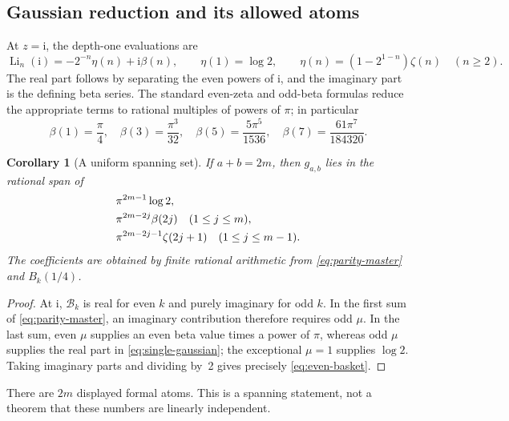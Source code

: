 \documentclass[11pt,a4paper]{article}
\numberwithin{equation}{section}
\newtheorem{corollary}[theorem]{Corollary}
\theoremstyle{definition}
\theoremstyle{remark}
\newcommand{\Li}{\operatorname{Li}}
\newcommand{\ii}{\mathrm{i}}
\newcommand{\BB}{\mathcal B}
\begin{document}
\subsection{Gaussian reduction and its allowed atoms}
At $z=\ii$, the depth-one evaluations are
\begin{equation}\label{eq:single-gaussian}
 \Li_n(\ii)=-2^{-n}\eta(n)+\ii\beta(n),\qquad
 \eta(1)=\log2,\qquad
 \eta(n)=(1-2^{1-n})\zeta(n)\quad(n\ge2).
\end{equation}
The real part follows by separating the even powers of $\ii$, and the imaginary part is the defining beta series. The standard even-zeta and odd-beta formulas reduce the appropriate terms to rational multiples of powers of $\pi$; in particular
\[
 \beta(1)=\frac\pi4,\quad \beta(3)=\frac{\pi^3}{32},\quad
 \beta(5)=\frac{5\pi^5}{1536},\quad
 \beta(7)=\frac{61\pi^7}{184320}.
\]

\begin{corollary}[A uniform spanning set]\label{cor:even-span}
If $a+b=2m$, then $g_{a,b}$ lies in the rational span of
\begin{align}\label{eq:even-basket}
 &\pi^{2m-1}\log2,\notag\\
 &\pi^{2m-2j}\beta(2j)\quad(1\le j\le m),\notag\\
 &\pi^{2m-2j-1}\zeta(2j+1)\quad(1\le j\le m-1).
\end{align}
The coefficients are obtained by finite rational arithmetic from
\eqref{eq:parity-master} and $B_k(1/4)$.
\end{corollary}
\begin{proof}
At $\ii$, $\BB_k$ is real for even $k$ and purely imaginary for odd $k$. In the first sum of \eqref{eq:parity-master}, an imaginary contribution therefore requires odd $\mu$. In the last sum, even $\mu$ supplies an even beta value times a power of $\pi$, whereas odd $\mu$ supplies the real part in \eqref{eq:single-gaussian}; the exceptional $\mu=1$ supplies $\log2$. Taking imaginary parts and dividing by~2 gives precisely \eqref{eq:even-basket}.
\end{proof}
There are $2m$ displayed formal atoms. This is a spanning statement, not a theorem that these numbers are linearly independent.
\end{document}
